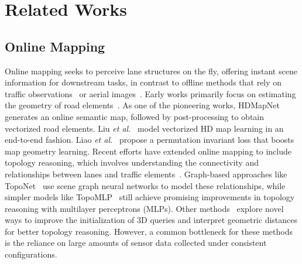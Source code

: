 \section{Related Works}
\subsection{Online Mapping}

Online mapping seeks to perceive lane structures on the fly, offering instant scene information for downstream tasks, in contrast to offline methods that rely on traffic observations~\cite{zurn2024autograph} or aerial images~\cite{Buchner2023UrbanLaneGraph, Blayney_2024_CVPR_bezier}. Early works primarily focus on estimating the geometry of road elements~\cite{li2021hdmapnet, liu2023vectormapnet, MapTR, maptrv2}. As one of the pioneering works, HDMapNet~\cite{li2021hdmapnet} generates an online semantic map, followed by post-processing to obtain vectorized road elements. Liu \textit{et al.}~\cite{liu2023vectormapnet} model vectorized HD map learning in an end-to-end fashion. Liao \textit{et al.}~\cite{MapTR, maptrv2} propose a permutation invariant loss that boosts map geometry learning. Recent efforts have extended online mapping to include topology reasoning, which involves understanding the connectivity and relationships between lanes and traffic elements~\cite{wang2023openlanev2, li2023toponet, wu2024topomlp, fu2024topologic}. Graph-based approaches like TopoNet~\cite{li2023toponet} use scene graph neural networks to model these relationships, while simpler models like TopoMLP~\cite{wu2024topomlp} still achieve promising improvements in topology reasoning with multilayer perceptrons (MLPs). Other methods~\cite{li2024topo2d, fu2024topologic} explore novel ways to improve the initialization of 3D queries and interpret geometric distances for better topology reasoning. However, a common bottleneck for these methods is the reliance on large amounts of sensor data collected under consistent configurations.



